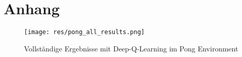\documentclass[11pt]{scrartcl}
\begin{document}
\newpage
%


\newpage
\listoffigures 
\listoftables 

\newpage
\section{Anhang}

\begin{figure}[htp]
\centering
\texttt{[image: res/pong\_all\_results.png]}
\caption{Vollständige Ergebnisse mit Deep-Q-Learning im Pong Environment}
\label{fig:pong_all_results}
\end{figure}
\end{document}
